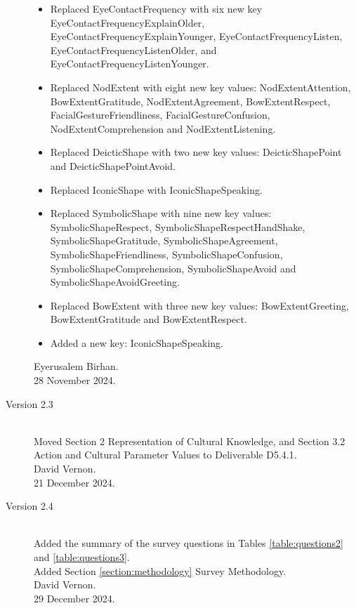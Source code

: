 \documentclass{CSSRforAfrica}
\begin{document}
\begin{description}
\begin{itemize}
    \item Replaced EyeContactFrequency with six new key 
 EyeContactFrequencyExplainOlder, EyeContactFrequencyExplainYounger, EyeContactFrequencyListen, EyeContactFrequencyListenOlder, and EyeContactFrequencyListenYounger.
 
    \item Replaced NodExtent with eight new key values: 
    NodExtentAttention, BowExtentGratitude, NodExtentAgreement, BowExtentRespect, FacialGestureFriendliness, FacialGestureConfusion, NodExtentComprehension and NodExtentListening.
    
     \item Replaced DeicticShape with two new key values: 
    DeicticShapePoint and DeicticShapePointAvoid.
    
    \item Replaced IconicShape with IconicShapeSpeaking.
    
    \item Replaced SymbolicShape with nine new key values: 
    SymbolicShapeRespect, SymbolicShapeRespectHandShake, SymbolicShapeGratitude, SymbolicShapeAgreement, SymbolicShapeFriendliness, SymbolicShapeConfusion, SymbolicShapeComprehension, SymbolicShapeAvoid and SymbolicShapeAvoidGreeting.
    
     \item Replaced BowExtent with three new key values: BowExtentGreeting, BowExtentGratitude and BowExtentRespect.
     \item Added a new key: IconicShapeSpeaking.
\end{itemize}
Eyerusalem Birhan.\\
28 November 2024.   


\item [Version 2.3]~ \\
Moved Section 2 Representation of Cultural Knowledge, and Section 3.2 Action and Cultural Parameter Values to Deliverable D5.4.1.\\
David Vernon.\\
21 December 2024.   

\item [Version 2.4]~ \\
Added the summary of the survey questions in Tables \ref{table:questions2} and \ref{table:questions3}. \\
Added Section  \ref{section:methodology} Survey Methodology. \\
David Vernon.\\
29 December 2024. 



\end{description}
\end{document}
